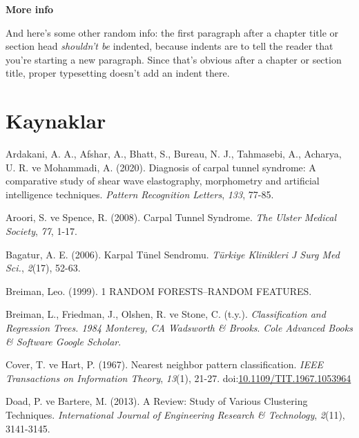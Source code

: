 \documentclass[12pt,twoside]{deuthesis}
\begin{document}
\textbf{More info}

And here's some other random info: the first paragraph after a chapter title or section head \emph{shouldn't be} indented, because indents are to tell the reader that you're starting a new paragraph. Since that's obvious after a chapter or section title, proper typesetting doesn't add an indent there.

\hypertarget{kaynaklar}{%
\chapter*{Kaynaklar}\label{kaynaklar}}


\hypertarget{refs}{}
\begin{CSLReferences}{1}{0}
\leavevmode{}%
Ardakani, A. A., Afshar, A., Bhatt, S., Bureau, N. J., Tahmasebi, A., Acharya, U. R. ve Mohammadi, A. (2020). Diagnosis of carpal tunnel syndrome: A comparative study of shear wave elastography, morphometry and artificial intelligence techniques. \emph{Pattern Recognition Letters}, \emph{133}, 77-85.

\leavevmode{}%
Aroori, S. ve Spence, R. (2008). Carpal Tunnel Syndrome. \emph{The Ulster Medical Society}, \emph{77}, 1-17.

\leavevmode{}%
Bagatur, A. E. (2006). Karpal Tünel Sendromu. \emph{Türkiye Klinikleri J Surg Med Sci.}, \emph{2}(17), 52-63.

\leavevmode{}%
Breiman, Leo. (1999). 1 RANDOM FORESTS--RANDOM FEATURES.

\leavevmode{}%
Breiman, L., Friedman, J., Olshen, R. ve Stone, C. (t.y.). \emph{Classification and Regression Trees. 1984 Monterey, CA Wadsworth \& Brooks}. \emph{Cole Advanced Books \& Software Google Scholar}.

\leavevmode{}%
Cover, T. ve Hart, P. (1967). Nearest neighbor pattern classification. \emph{IEEE Transactions on Information Theory}, \emph{13}(1), 21-27. doi:\href{https://doi.org/10.1109/TIT.1967.1053964}{10.1109/TIT.1967.1053964}

\leavevmode{}%
Doad, P. ve Bartere, M. (2013). A Review: Study of Various Clustering Techniques. \emph{International Journal of Engineering Research \& Technology}, \emph{2}(11), 3141-3145.


\end{CSLReferences}
\end{document}
